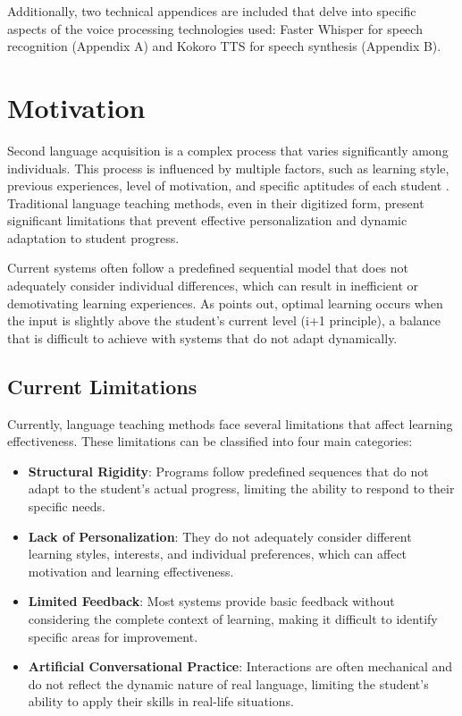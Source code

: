 Additionally, two technical appendices are included that delve into specific aspects of the voice processing technologies used: Faster Whisper for speech recognition (Appendix A) and Kokoro TTS for speech synthesis (Appendix B).

\section{Motivation}
\label{sec:motivation}

Second language acquisition is a complex process that varies significantly among individuals. This process is influenced by multiple factors, such as learning style, previous experiences, level of motivation, and specific aptitudes of each student \cite{ellis1994study}. Traditional language teaching methods, even in their digitized form, present significant limitations that prevent effective personalization and dynamic adaptation to student progress.

Current systems often follow a predefined sequential model that does not adequately consider individual differences, which can result in inefficient or demotivating learning experiences. As \cite{krashen1982principles} points out, optimal learning occurs when the input is slightly above the student's current level (i+1 principle), a balance that is difficult to achieve with systems that do not adapt dynamically.

\subsection{Current Limitations}
\label{subsec:current-limitations}

Currently, language teaching methods face several limitations that affect learning effectiveness. These limitations can be classified into four main categories:

\begin{itemize}
  \item \textbf{Structural Rigidity}: Programs follow predefined sequences that do not adapt to the student's actual progress, limiting the ability to respond to their specific needs.
  \item \textbf{Lack of Personalization}: They do not adequately consider different learning styles, interests, and individual preferences, which can affect motivation and learning effectiveness.
  \item \textbf{Limited Feedback}: Most systems provide basic feedback without considering the complete context of learning, making it difficult to identify specific areas for improvement.
  \item \textbf{Artificial Conversational Practice}: Interactions are often mechanical and do not reflect the dynamic nature of real language, limiting the student's ability to apply their skills in real-life situations.
\end{itemize}

